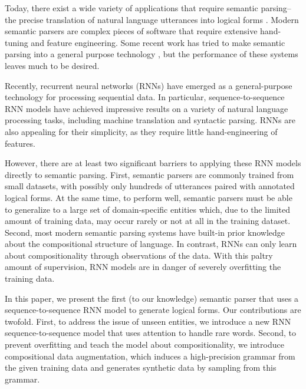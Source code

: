 \documentclass[11pt,letterpaper]{article}
\newcommand\pl[1]{\textcolor{red}{[PL: #1]}}
\begin{document}
Today, there exist a wide variety of applications that 
require semantic parsing--the precise translation of
natural language utterances into logical forms 
\cite{zelle96geoquery,zettlemoyer05ccg,zettlemoyer07relaxed,liang11dcs,artzi2013weakly,berant2013freebase,kushman2013regex}.
Modern semantic parsers are complex pieces of software
that require extensive hand-tuning and feature engineering.
Some recent work has tried to make semantic parsing
into a general purpose technology \cite{wang2015overnight},
but the performance of these systems leaves much to be desired.

Recently, recurrent neural networks (RNNs) have emerged
as a general-purpose technology for processing sequential data.
In particular, sequence-to-sequence RNN models
have achieved impressive results on a variety of natural language processing
tasks, including machine translation and syntactic parsing.
RNNs are also appealing for their simplicity, as they require 
little hand-engineering of features.

However, there are at least two significant barriers to applying these 
RNN models directly to semantic parsing.
First, semantic parsers are commonly trained from small datasets,
with possibly only hundreds of utterances paired with annotated logical forms.
At the same time, to perform well, semantic parsers
must be able to generalize to a large set of 
domain-specific entities which, due to the limited
amount of training data, may occur rarely or not at all
in the training dataset.
Second, most modern semantic parsing systems have built-in
prior knowledge about the compositional structure of language.
In contrast, RNNs can only learn about compositionality
through observations of the data.
With this paltry amount of supervision,
RNN models are in danger of severely overfitting the training data.

In this paper, we present the first (to our knowledge)
semantic parser that uses a sequence-to-sequence RNN model to generate
logical forms.  
Our contributions are twofold.
First, to address the issue of unseen entities,
we introduce a new RNN sequence-to-sequence model that uses 
attention to handle rare words.
Second, to prevent overfitting and teach the model about compositionality,
we introduce compositional data augmentation,
which induces a high-precision grammar from the given training data
and generates synthetic data by sampling from this grammar.

\end{document}
